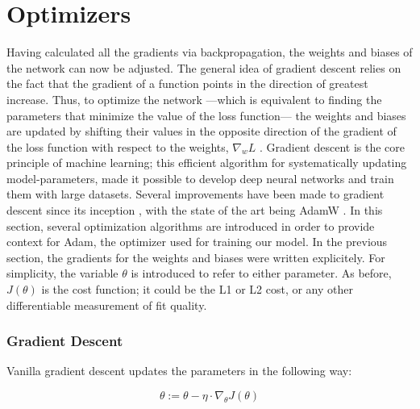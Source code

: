 \section{Optimizers}
Having calculated all the gradients via backpropagation, the weights and biases of the network can now be adjusted. The general idea of gradient descent relies on the fact that the gradient of a function points in the direction of greatest increase. Thus, to optimize the network ---which is equivalent to finding the parameters that minimize the value of the loss function--- the weights and biases are updated by shifting their values in the opposite direction of the gradient of the loss function with respect to the weights, $ \nabla_w L $ . Gradient descent is the core principle of machine learning; this efficient algorithm for systematically updating model-parameters, made it possible to develop deep neural networks and train them with large datasets. Several improvements have been made to gradient descent since its inception \cite{cauchy-orig-grad-descent}, with the state of the art being AdamW \cite{AdamW-orig}. In this section, several optimization algorithms are introduced in order to provide context for Adam, the optimizer used for training our model. In the previous section, the gradients for the weights and biases were written explicitely. For simplicity, the variable $ \theta $ is introduced to refer to either parameter. As before, $ J(\theta) $  is the cost function; it could be the L1 or L2 cost, or any other differentiable measurement of fit quality.

\subsubsection{Gradient Descent}
Vanilla gradient descent \cite{gradient-descent-rev-article} updates the parameters in the following way:

\begin{equation}
    \label{batch-grad-descent}
    \theta := \theta - \eta \cdot \nabla_\theta J(\theta)
\end{equation}

